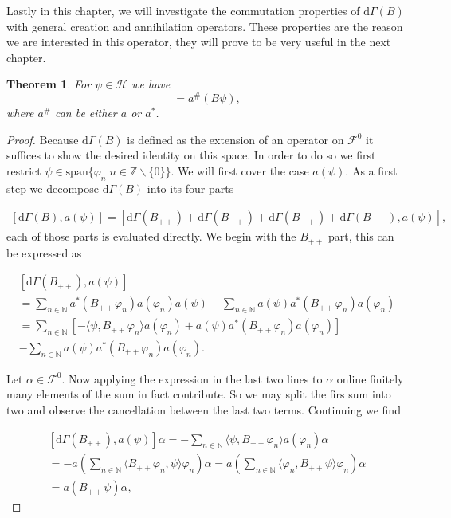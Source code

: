 \documentclass[b5paper,draft,openbib,12pt]{memoir}
\newtheorem{Thm}[Def]{Theorem}
\begin{document}
Lastly in this chapter, we will investigate the commutation properties of \(\mathrm{d}\Gamma(B)\) with general creation and annihilation operators.
These properties are the reason we are interested in this operator, they will prove to be very useful in the next chapter.

\begin{Thm}\label{Commutation Gamma}
For \(\psi \in \mathcal{H}\) we have
\begin{equation}
[\mathrm{d}\Gamma(B),a^\# (\psi)]=a^\#(B\psi),
\end{equation}
where \(a^\#\) can be either \(a\) or \(a^*\).
\end{Thm}
\begin{proof}
Because \(\mathrm{d}\Gamma(B)\) is defined as the extension of an operator on \(\mathcal{F}^0\) it suffices to show the desired identity on this space. In order to do so
we first restrict \(\psi\in \text{span}\{\varphi_{n}| n \in \mathbb{Z}\backslash\{0\}\}\). We will first cover the case \(a(\psi)\).  
As a first step we decompose \(\mathrm{d}\Gamma(B)\) into its four parts

\begin{align}
\left[ \mathrm{d}\Gamma(B),a(\psi) \right] = \left[ \mathrm{d}\Gamma(B_{++})
+\mathrm{d}\Gamma(B_{-+})+\mathrm{d}\Gamma(B_{-+})+\mathrm{d}\Gamma(B_{--}),a(\psi) \right],
\end{align}
each of those parts is evaluated directly. We begin with the \(B_{++}\) part, this can be expressed as

\begin{align}
\left[ \mathrm{d}\Gamma(B_{++}),a(\psi) \right] \\
= \sum_{n\in\mathbb{N}} a^*(B_{++}\varphi_n)a(\varphi_n) a(\psi) - \sum_{n\in\mathbb{N}} a(\psi) a^*(B_{++}\varphi_n)a(\varphi_n) \\
=\sum_{n\in\mathbb{N}} \left[ -\langle \psi, B_{++} \varphi_n\rangle a(\varphi_n) +a(\psi) a^*(B_{++}\varphi_n)a(\varphi_n) \right]  \\
- \sum_{n\in\mathbb{N}} a(\psi) a^*(B_{++}\varphi_n)a(\varphi_n).
\end{align}

Let \(\alpha \in \mathcal{F}^0\). Now applying the expression in the last two lines to \(\alpha\) online finitely many elements of the sum in fact contribute.
So we may split the firs sum into two and observe the cancellation between the last two terms. Continuing we find

\begin{align}
\left[ \mathrm{d}\Gamma(B_{++}),a(\psi) \right] \alpha
=-\sum_{n\in\mathbb{N}}  \langle \psi, B_{++} \varphi_n\rangle a(\varphi_n)\alpha\\
=-a\left(\sum_{n\in\mathbb{N}} \langle B_{++}\varphi_n, \psi\rangle  \varphi_n  \right)\alpha
=a\left(\sum_{n\in\mathbb{N}} \langle \varphi_n, B_{++}\psi\rangle  \varphi_n  \right)\alpha\\
=a(B_{++}\psi)\alpha,
\end{align}


\end{proof}
\end{document}
